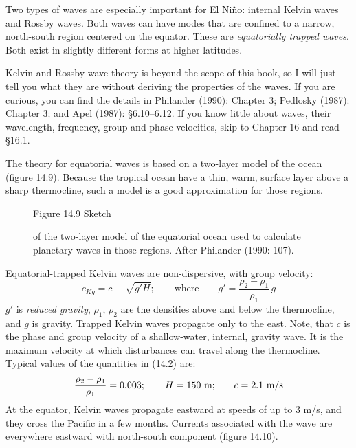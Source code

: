Two types of waves are especially important for El Ni\~{n}o: internal Kelvin waves and Rossby waves. Both waves can have modes that are confined to a narrow, north-south region centered on the equator. These are \textit{equatorially trapped waves}. Both exist in slightly different forms at higher latitudes.

Kelvin and Rossby wave theory is beyond the scope of this book, so I will just tell you what they are without deriving the properties of the waves. If you are curious, you can find the details in Philander (1990): Chapter 3; Pedlosky (1987): Chapter 3; and Apel (1987): \S6.10--6.12. If you know little about waves, their wavelength, frequency, group and phase velocities, skip to Chapter 16 and read \S16.1.

The theory for equatorial waves is based on a two-layer model of the
ocean (figure 14.9). Because the tropical ocean have a thin, warm, surface
layer above a sharp thermocline, such a model is a good
approximation for those regions.

\begin{figure}[t!]
\centering
{}
\footnotesize
Figure 14.9 Sketch \rule{0pt}{4ex}of the two-layer model of the equatorial ocean used to calculate planetary waves in those regions. After Philander (1990: 107).
\label{fig:modelsketch}
\end{figure}

Equatorial-trapped Kelvin waves are non-dispersive, with group velocity:
\begin{equation}
c_{Kg} = c \equiv \sqrt{g'H}; \qquad \text{where} \qquad
g' = \frac{\rho_2 - \rho_1}{\rho_1}\,g
\end{equation}
$g'$ is \textit{reduced gravity}, $\rho_1, \, \rho_2$ are the densities above and below the thermocline, and $g$ is gravity. Trapped Kelvin waves propagate only to the east. Note, that $c$ is the phase and group velocity of a shallow-water, internal, gravity wave. It is the maximum velocity at which disturbances can travel along the thermocline. Typical values of the quantities in (14.2) are:
\begin{equation}
\frac{\rho_2 - \rho_1}{\rho_1} = 0.003; \qquad H=150 \text{ m;} \qquad c =2.1
\text{ m/s} \notag
\end{equation}
At the equator, Kelvin waves propagate eastward at speeds of up to 3 m/s, and they cross the Pacific in a few months. Currents associated with the wave are everywhere eastward with north-south component (figure 14.10).

